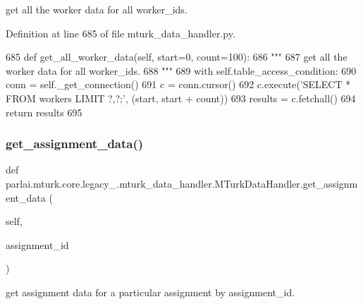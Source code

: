 \begin{DoxyVerb}get all the worker data for all worker_ids.
\end{DoxyVerb}
 

Definition at line 685 of file mturk\+\_\+data\+\_\+handler.\+py.


\begin{DoxyCode}
685     \textcolor{keyword}{def }get\_all\_worker\_data(self, start=0, count=100):
686         \textcolor{stringliteral}{"""}
687 \textcolor{stringliteral}{        get all the worker data for all worker\_ids.}
688 \textcolor{stringliteral}{        """}
689         with self.table\_access\_condition:
690             conn = self.\_get\_connection()
691             c = conn.cursor()
692             c.execute(\textcolor{stringliteral}{'SELECT * FROM workers LIMIT ?,?;'}, (start, start + count))
693             results = c.fetchall()
694             \textcolor{keywordflow}{return} results
695 
\end{DoxyCode}
\mbox{\label{classparlai_1_1mturk_1_1core_1_1legacy__2018_1_1mturk__data__handler_1_1MTurkDataHandler_a31d6cd2577202bf2e6e4984a02f14f2a}} 
\subsubsection{\texorpdfstring{get\+\_\+assignment\+\_\+data()}{get\_assignment\_data()}}
{\footnotesize\ttfamily def parlai.\+mturk.\+core.\+legacy\+\_.\+mturk\+\_\+data\+\_\+handler.\+M\+Turk\+Data\+Handler.\+get\+\_\+assignment\+\_\+data (\begin{DoxyParamCaption}\item[{}]{self,  }\item[{}]{assignment\+\_\+id }\end{DoxyParamCaption})}

\begin{DoxyVerb}get assignment data for a particular assignment by assignment_id.
\end{DoxyVerb}
 

